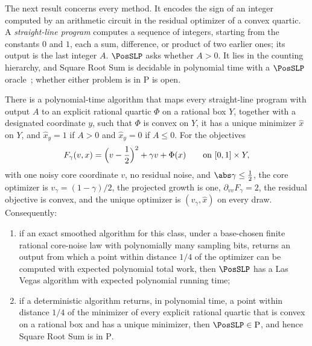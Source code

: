 The next result concerns every method. It encodes the sign of an integer
computed by an arithmetic circuit in the residual optimizer of a convex
quartic. A \emph{straight-line program} computes a sequence of integers,
starting from the constants $0$ and $1$, each a sum, difference, or product
of two earlier ones; its output is the last integer $A$. $\PosSLP$ asks
whether $A>0$. It lies in the counting hierarchy, and Square Root Sum
is decidable in polynomial time with a $\PosSLP$
oracle~\citep{allender2009-on-the-complexity-of-numerical}; whether either problem is in $\mathrm P$ is
open.

\begin{theorem}\label{thm:lim:posslp}
There is a polynomial-time algorithm that maps every straight-line program
with output $A$ to an explicit rational quartic $\Phi$ on a rational box
$Y$, together with a designated coordinate $y$, such that $\Phi$ is convex on
$Y$, it has a unique minimizer $\hat x$ on $Y$, and $\hat x_y=1$ if $A>0$ and
$\hat x_y=0$ if $A\le0$. For the objectives
\[
 F_\gamma(v,x)=\Bigl(v-\frac12\Bigr)^2+\gamma v+\Phi(x)\qquad\text{on }[0,1]\times Y,
\]
with one noisy core coordinate $v$, no residual noise, and
$\abs\gamma\le\frac12$, the core optimizer is $v_\gamma=(1-\gamma)/2$, the
projected growth is one, $\partial_{vv}F_\gamma=2$, the residual objective
is convex, and the unique optimizer is $(v_\gamma,\hat x)$ on every draw.
Consequently:
\begin{enumerate}[label=(\alph*)]
\item if an exact smoothed algorithm for this class, under a base-chosen
finite rational core-noise law with polynomially many sampling bits,
returns an output from which a point within distance $1/4$ of the optimizer
can be computed with expected polynomial total work, then $\PosSLP$ has a
Las Vegas algorithm with expected polynomial running time;
\item if a deterministic algorithm returns, in polynomial time, a point
within distance $1/4$ of the minimizer of every explicit rational quartic
that is convex on a rational box and has a unique minimizer, then
$\PosSLP\in\mathrm P$, and hence Square Root Sum is in $\mathrm P$.
\end{enumerate}
\end{theorem}

